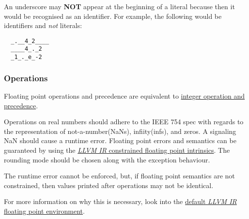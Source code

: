 \documentclass[types.tex]{subfiles}
\begin{document}
An underscore may \textbf{NOT} appear at the beginning of a  literal because then it
would be recognised as an identifier. For example, the following would be identifiers and
\textit{not}  literals:
\begin{lstlisting}
  _.__4_2____
  ____4_._2
  _1_._e_-2
\end{lstlisting}

\subsubsection{Operations}
\label{sssec:real_ops}
Floating point operations and precedence are equivalent to \hyperref[sssec:integer_ops]{integer
operation and precedence}.

Operations on real numbers should adhere to the \textsf{IEEE 754} spec with regards to the
representation of not-a-number(NaNs), infiity(infs), and zeros. A signaling NaN should cause a
runtime error. Floating point errors and semantics can be guaranteed by using the
\href{https://llvm.org/docs/LangRef.html\#constrained-floating-point-intrinsics}{\textit{LLVM IR}
constrained floating point intrinsics}. The  rounding  mode should be chosen
along with the  exception behaviour.

The runtime error cannot be enforced, but, if floating point semantics are not constrained, then
 values printed after operations may not be identical.


For more information on why this is necessary, look into the
\href{https://llvm.org/docs/LangRef.html\#floatenv}{default \textit{LLVM IR} floating point
environment}.
\end{document}
